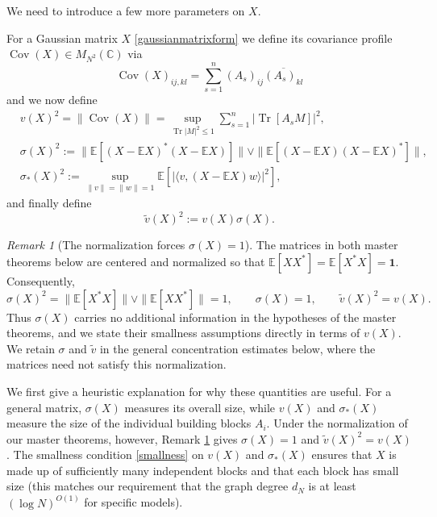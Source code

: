 \documentclass[11pt,reqno]{amsart}
\theoremstyle{plain}
\theoremstyle{remark}
\newtheorem{remark}[theorem]{Remark}
\numberwithin{equation}{section}
\begin{document}
We need to introduce a few more parameters on $X$.


For a Gaussian matrix $X$ \eqref{gaussianmatrixform} we define its covariance profile $\operatorname{Cov}(X)\in M_{N^2}(\mathbb{C})$ via 
$$
\operatorname{Cov}(X)_{ij,kl}=\sum_{s=1}^n (A_s)_{ij}\overline{(A_s)_{kl}} 
$$ and we now define 
$$\begin{aligned}
&v(X)^2=\|\operatorname{Cov}(X)\|=\sup_{\operatorname{Tr}|M|^2\leq 1}\sum_{s=1}^n |\operatorname{Tr}[A_sM]|^2,\\
&\sigma(X)^2:=\|\mathbb{E}[(X-\mathbb{E}X)^*(X-\mathbb{E}X)]\|\vee\|\mathbb{E}[(X-\mathbb{E}X)(X-\mathbb{E}X)^*]\|,\\
&\sigma_*(X)^2:=\sup_{\|v\|=\|w\|=1}\mathbb{E}[|\langle v,(X-\mathbb{E}X)w\rangle|^2],
\end{aligned}$$
and finally define $$\tilde{v}(X)^2:=v(X)\sigma(X).$$

\begin{remark}[The normalization forces $\sigma(X)=1$]\label{sigmaone}
The matrices in both master theorems below are centered and normalized so that
\(\mathbb{E}[XX^*]=\mathbb{E}[X^*X]=\mathbf{1}\). Consequently,
\[
\sigma(X)^2
=\|\mathbb{E}[X^*X]\|\vee\|\mathbb{E}[XX^*]\|
=1,
\qquad
\sigma(X)=1,
\qquad
\widetilde v(X)^2=v(X).
\]
Thus $\sigma(X)$ carries no additional information in the hypotheses of the master
theorems, and we state their smallness assumptions directly in terms of $v(X)$.
We retain $\sigma$ and $\widetilde v$ in the general concentration estimates below,
where the matrices need not satisfy this normalization.
\end{remark}

We first give a heuristic explanation for why these quantities are useful. For a general matrix, $\sigma(X)$ measures its overall size, while $v(X)$ and $\sigma_*(X)$ measure the size of the individual building blocks $A_i$. Under the normalization of our master theorems, however, Remark \ref{sigmaone} gives $\sigma(X)=1$ and $\widetilde v(X)^2=v(X)$. The smallness condition \eqref{smallness} on $v(X)$ and $\sigma_*(X)$ ensures that $X$ is made up of sufficiently many independent blocks and that each block has small size (this matches our requirement that the graph degree $d_N$ is at least $(\log N)^{O(1)}$ for specific models). 
\end{document}
